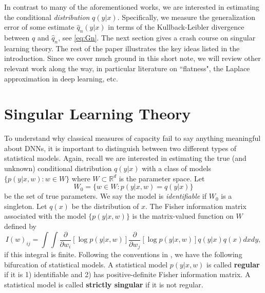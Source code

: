 \documentclass{article} %
\begin{document}
In contrast to many of the aforementioned works, we are interested in estimating the conditional \textit{distribution} $q(y|x)$. Specifically, we measure the generalization error of some estimate $\hat q_n(y|x)$ in terms of the Kullback-Leibler divergence between $q$ and $\hat q_n$, see \eqref{eq:Gn}. The next section gives a crash course on singular learning theory. The rest of the paper illustrates the key ideas listed in the introduction. Since we cover much ground in this short note, we will review other relevant work along the way, in particular literature on ``flatness", the Laplace approximation in deep learning, etc. 

\section{Singular Learning Theory}
To understand why classical measures of capacity fail to say anything meaningful about DNNs, it is important to distinguish between two different types of statistical models. Again, recall we are interested in estimating the true (and unknown) conditional distribution $q(y|x)$ with a class of models $\{p(y|x,w): w \in W\}$ where $W \subset \mathbb R^d$ is the parameter space. Let 
$$
W_0 = \{w \in W: p(y|x,w)=q(y|x)\}
$$
 be the set of true parameters. We say the model is \textit{identifiable} if $W_0$ is a singleton. Let $q(x)$ be the distribution of $x$. The Fisher information matrix associated with the model $\{p(y|x,w)\}$ is the matrix-valued function on $W$ defined by
 \begin{equation*}
 I(w)_{ij} = \int\!\int \frac{\partial}{\partial w_i}[ \log p(y|x,w) ] \frac{\partial}{\partial w_j}[ \log p(y|x,w) ] q(y|x) q(x) dx dy,
 \label{eq:FIM}
 \end{equation*}
if this integral is finite. 
Following the conventions in \cite{watanabe_algebraic_2009}, we have the following bifurcation of statistical models.
A statistical model $p(y|x,w)$ is called \textbf{regular} if it is 1) identifiable and 2) has positive-definite Fisher information matrix. A statistical model is called \textbf{strictly singular} if it is not regular. 
\end{document}
